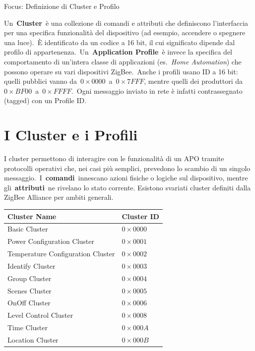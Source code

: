 \documentclass[
  italian,
  openany]{book}
\newcounter{none} %
\begin{document}
\begin{calloutimportant}{Focus: Definizione di Cluster e Profilo }

Un~\textbf{Cluster}~è una collezione di comandi e attributi che
definiscono l'interfaccia per una specifica funzionalità del dispositivo
(ad esempio, accendere o spegnere una luce).~È identificato da un codice
a 16 bit, il cui significato dipende dal profilo di
appartenenza.~Un~\textbf{Application Profile}~è invece la specifica del
comportamento di un'intera classe di applicazioni (es.~\emph{Home
Automation}) che possono operare su vari dispositivi ZigBee.~Anche i
profili usano ID a 16 bit: quelli pubblici vanno
da~\(0\times0000\)~a~\(0\times7FFF\), mentre quelli dei produttori
da~\(0\times BF00\)~a~\(0\times FFFF\).~Ogni messaggio inviato in rete è
infatti contrassegnato (tagged) con un Profile ID.

\end{calloutimportant}

\section{I Cluster e i Profili}\label{i-cluster-e-i-profili}

I cluster permettono di interagire con le funzionalità di un APO tramite
protocolli operativi che, nei casi più semplici, prevedono lo scambio di
un singolo messaggio.~I~\textbf{comandi}~innescano azioni fisiche o
logiche sul dispositivo, mentre gli~\textbf{attributi}~ne rivelano lo
stato corrente. Esistono svariati cluster definiti dalla ZigBee Alliance
per ambiti generali.

{\def\LTcaptype{none} %
\begin{longtable}[]{@{}ll@{}}
\toprule\noalign{}
\textbf{Cluster Name} & \textbf{Cluster ID} \\
\midrule\noalign{}
\endhead
\bottomrule\noalign{}
\endlastfoot
Basic Cluster & \(0\times0000\) \\
Power Configuration Cluster & \(0\times0001\) \\
Temperature Configuration Cluster & \(0\times0002\) \\
Identify Cluster & \(0\times0003\) \\
Group Cluster & \(0\times0004\) \\
Scenes Cluster & \(0\times0005\) \\
OnOff Cluster & \(0\times0006\) \\
Level Control Cluster & \(0\times0008\) \\
Time Cluster & \(0\times000A\) \\
Location Cluster & \(0\times000B\) \\
\end{longtable}
}
\end{document}
